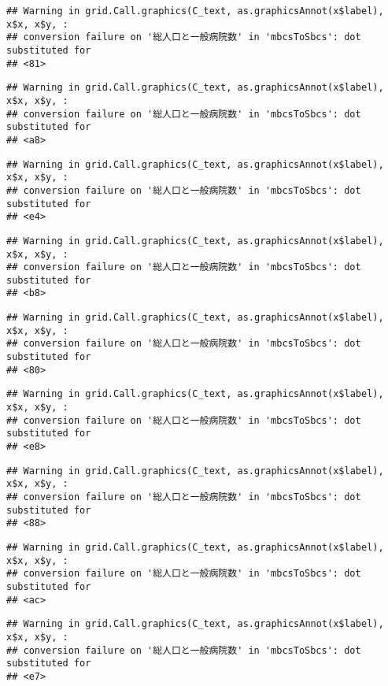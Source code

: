 \documentclass[
]{article}
\begin{document}
\begin{verbatim}
## Warning in grid.Call.graphics(C_text, as.graphicsAnnot(x$label), x$x, x$y, :
## conversion failure on '総人口と一般病院数' in 'mbcsToSbcs': dot substituted for
## <81>
\end{verbatim}

\begin{verbatim}
## Warning in grid.Call.graphics(C_text, as.graphicsAnnot(x$label), x$x, x$y, :
## conversion failure on '総人口と一般病院数' in 'mbcsToSbcs': dot substituted for
## <a8>
\end{verbatim}

\begin{verbatim}
## Warning in grid.Call.graphics(C_text, as.graphicsAnnot(x$label), x$x, x$y, :
## conversion failure on '総人口と一般病院数' in 'mbcsToSbcs': dot substituted for
## <e4>
\end{verbatim}

\begin{verbatim}
## Warning in grid.Call.graphics(C_text, as.graphicsAnnot(x$label), x$x, x$y, :
## conversion failure on '総人口と一般病院数' in 'mbcsToSbcs': dot substituted for
## <b8>
\end{verbatim}

\begin{verbatim}
## Warning in grid.Call.graphics(C_text, as.graphicsAnnot(x$label), x$x, x$y, :
## conversion failure on '総人口と一般病院数' in 'mbcsToSbcs': dot substituted for
## <80>
\end{verbatim}

\begin{verbatim}
## Warning in grid.Call.graphics(C_text, as.graphicsAnnot(x$label), x$x, x$y, :
## conversion failure on '総人口と一般病院数' in 'mbcsToSbcs': dot substituted for
## <e8>
\end{verbatim}

\begin{verbatim}
## Warning in grid.Call.graphics(C_text, as.graphicsAnnot(x$label), x$x, x$y, :
## conversion failure on '総人口と一般病院数' in 'mbcsToSbcs': dot substituted for
## <88>
\end{verbatim}

\begin{verbatim}
## Warning in grid.Call.graphics(C_text, as.graphicsAnnot(x$label), x$x, x$y, :
## conversion failure on '総人口と一般病院数' in 'mbcsToSbcs': dot substituted for
## <ac>
\end{verbatim}

\begin{verbatim}
## Warning in grid.Call.graphics(C_text, as.graphicsAnnot(x$label), x$x, x$y, :
## conversion failure on '総人口と一般病院数' in 'mbcsToSbcs': dot substituted for
## <e7>
\end{verbatim}
\end{document}
